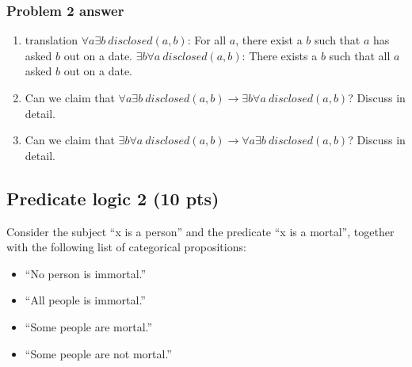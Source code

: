 \documentclass[12pt]{article}
\begin{document}
\subsubsection{Problem 2 answer}
\begin{enumerate}
\item translation
	\subitem $\forall a \exists b~disclosed(a, b)$: For all $a$, there exist a $b$ such that $a$ has asked $b$ out on a date. 
	\subitem $\exists b \forall a ~disclosed(a, b)$: There exists a $b$ such that all $a$ asked $b$ out on a date.
\item Can we claim that $\forall a \exists b~disclosed(a, b) \rightarrow \exists b \forall a ~disclosed(a, b)$? Discuss in detail.
	\subitem  
\item Can we claim that $\exists b \forall a ~disclosed(a, b) \rightarrow \forall a \exists b~disclosed(a, b)$? Discuss in detail.
\end{enumerate} 


\newpage

\subsection{Predicate logic 2 (10 pts)}

\noindent Consider the subject ``x is a person'' and the predicate ``x is a mortal'', together with the following list of categorical propositions:
\begin{itemize}
\item ``No person is immortal.''

\item ``All people is immortal.''

\item ``Some people are mortal.''	

\item ``Some people are not mortal.''	
\end{itemize} 
\end{document}
